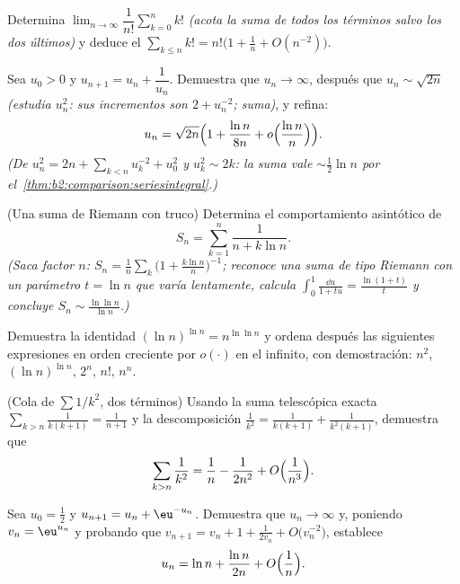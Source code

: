 \begin{exercise}[$\star\star$]\label{exo:b2:comparison:7}
Determina $\lim_{n\to\infty} \dfrac{1}{n!}\sum_{k=0}^{n} k!$
\emph{(acota la suma de todos los términos salvo los dos últimos)} y
deduce el  $\sum_{k \leq n} k! = n!\bigl(1 +
\frac1n + O(n^{-2})\bigr)$.
\end{exercise}

\begin{exercise}[$\star\star\star$]\label{exo:b2:comparison:8}
Sea $u_0 > 0$ y $u_{n+1} = u_n + \dfrac{1}{u_n}$. Demuestra que $u_n
\to \infty$, después que $u_n \sim \sqrt{2n}$ \emph{(estudia
$u_n^2$: sus incrementos son $2 + u_n^{-2}$; suma)}, y refina:
\[
u_n = \sqrt{2n}\Bigl(1 + \frac{\ln n}{8n} +
o\Bigl(\frac{\ln n}{n}\Bigr)\Bigr).
\]
\emph{(De $u_n^2 = 2n + \sum_{k<n} u_k^{-2} + u_0^2$ y $u_k^2 \sim
2k$: la suma vale $\sim \frac12\ln n$ por el~\cref{thm:b2:comparison:seriesintegral}.)}
\end{exercise}

\begin{exercise}[$\star\star\star$]\label{exo:b2:comparison:9}
(Una suma de Riemann con truco) Determina el comportamiento
asintótico de
\[
S_n = \sum_{k=1}^{n} \frac{1}{n + k\ln n} .
\]
\emph{(Saca factor $n$: $S_n = \frac1n\sum_k \bigl(1 + \frac{k\ln
n}{n}\bigr)^{-1}$; reconoce una suma de tipo Riemann con un
parámetro $t = \ln n$ que varía lentamente, calcula $\int_0^1
\frac{\dd u}{1 + tu} = \frac{\ln(1+t)}{t}$ y concluye $S_n \sim
\frac{\ln\ln n}{\ln n}$.)}
\end{exercise}

\begin{exercise}[$\star$]\label{exo:b2:comparison:10}
Demuestra la identidad $(\ln n)^{\ln n} = n^{\ln\ln n}$ y ordena
después las siguientes expresiones en orden creciente por $o(\cdot)$
en el infinito, con demostración: $n^2$, $(\ln n)^{\ln n}$, $2^n$,
$n!$, $n^n$.
\end{exercise}

\begin{exercise}[$\star\star$]\label{exo:b2:comparison:11}
(Cola de $\sum 1/k^2$, dos términos) Usando la suma telescópica
exacta $\sum_{k > n} \frac{1}{k(k+1)} = \frac{1}{n+1}$ y la
descomposición $\frac1{k^2} = \frac{1}{k(k+1)} +
\frac{1}{k^2(k+1)}$, demuestra que
\[
\sum_{k > n} \frac{1}{k^2}
= \frac1n - \frac{1}{2n^2} + O\Bigl(\frac{1}{n^3}\Bigr).
\]
\end{exercise}

\begin{exercise}[$\star\star\star$]\label{exo:b2:comparison:12}
Sea $u_0 = \frac12$ y $u_{n+1} = u_n + \eu^{-u_n}$. Demuestra que
$u_n \to \infty$ y, poniendo $v_n = \eu^{u_n}$ y probando que
$v_{n+1} = v_n + 1 + \frac{1}{2v_n} + O\bigl(v_n^{-2}\bigr)$,
establece
\[
u_n = \ln n + \frac{\ln n}{2n} + O\Bigl(\frac1n\Bigr).
\]
\end{exercise}

